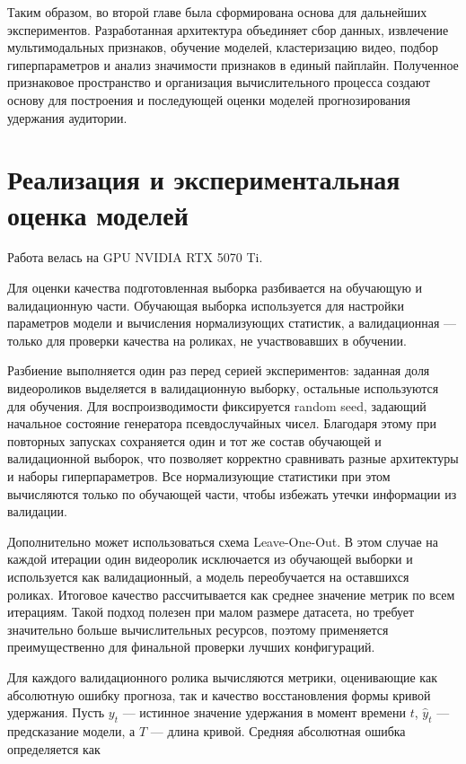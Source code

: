 \documentclass[times]{itmo-student-thesis}
\begin{document}
Таким образом, во второй главе была сформирована  основа для дальнейших экспериментов. Разработанная архитектура объединяет сбор данных, извлечение мультимодальных признаков, обучение моделей, кластеризацию видео, подбор гиперпараметров и анализ значимости признаков в единый пайплайн. Полученное признаковое пространство и организация вычислительного процесса создают основу для построения и последующей оценки моделей прогнозирования удержания аудитории.

\chapter{Реализация и экспериментальная оценка моделей}

Работа велась на GPU NVIDIA RTX 5070 Ti.

Для оценки качества подготовленная выборка разбивается на обучающую и валидационную части. Обучающая выборка используется для настройки параметров модели и вычисления нормализующих статистик, а валидационная — только для проверки качества на роликах, не участвовавших в обучении.

Разбиение выполняется один раз перед серией экспериментов: заданная доля видеороликов выделяется в валидационную выборку, остальные используются для обучения. Для воспроизводимости фиксируется random seed, задающий начальное состояние генератора псевдослучайных чисел. Благодаря этому при повторных запусках сохраняется один и тот же состав обучающей и валидационной выборок, что позволяет корректно сравнивать разные архитектуры и наборы гиперпараметров. Все нормализующие статистики при этом вычисляются только по обучающей части, чтобы избежать утечки информации из валидации.

Дополнительно может использоваться схема Leave-One-Out. В этом случае на каждой итерации один видеоролик исключается из обучающей выборки и используется как валидационный, а модель переобучается на оставшихся роликах. Итоговое качество рассчитывается как среднее значение метрик по всем итерациям. Такой подход полезен при малом размере датасета, но требует значительно больше вычислительных ресурсов, поэтому применяется преимущественно для финальной проверки лучших конфигураций.

Для каждого валидационного ролика вычисляются метрики, оценивающие как абсолютную ошибку прогноза, так и качество восстановления формы кривой удержания. Пусть $y_t$ — истинное значение удержания в момент времени $t$, $\hat y_t$ — предсказание модели, а $T$ — длина кривой. Средняя абсолютная ошибка определяется как
\end{document}
